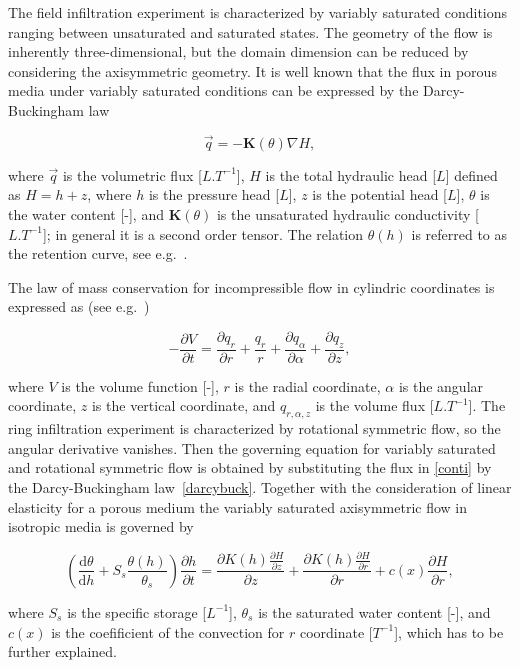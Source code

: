 \documentclass[review]{myarticle}
\newenvironment{lineq}
    {\begin{linenomath*}
    \begin{equation}
    }
    { 
    \end{equation} 
    \end{linenomath*}
    }
\newcommand{\dd}{\mathrm{d}}
\begin{document}
The field infiltration experiment is characterized by variably saturated conditions ranging between unsaturated and saturated states. The geometry of the flow is inherently three-dimensional, but the domain dimension can be reduced by considering the axisymmetric geometry. It is well known that the flux in porous media under variably saturated conditions can be expressed by the Darcy-Buckingham law~\citep{buckingham} \begin{lineq}\label{darcybuck}\vec{q} = -\mathbf{K}(\theta) \nabla H,\end{lineq} where $\vec{q}$ is the volumetric flux [$L.T^{-1}$], $H$ is the total hydraulic head [$L$] defined as $H=h+z$, where $h$ is the pressure head [$L$], $z$ is the potential head [$L$], $\theta$ is the water content [-], and $\mathbf{K}(\theta)$ is the unsaturated hydraulic conductivity  [$L.T^{-1}$]; in general it is a  second order tensor. The relation $\theta(h)$ is referred to as the retention curve, see e.g.~\citep{vangenuchten}.

The law of mass conservation  for incompressible flow in cylindric coordinates  is expressed as (see e.g.~\citep{bear1979})
\begin{lineq}
\label{conti}
-\frac{\partial V}{\partial t} = \frac{\partial q_r}{\partial r} + \frac{q_r}{r} + \frac{\partial q_{\alpha}}{\partial \alpha} + \frac{\partial q_z}{\partial z} ,
\end{lineq}
where $V$ is the volume function [-],  $r$ is the radial coordinate, $\alpha$ is the angular coordinate,  $z$ is the vertical coordinate, and $q_{r, \alpha, z}$ is the  volume flux [$L.T^{-1}$]. The ring infiltration experiment is characterized by rotational symmetric flow, so the angular derivative vanishes. Then the governing equation for  variably saturated and rotational symmetric flow is obtained by substituting the flux in \eqref{conti} by the Darcy-Buckingham law~\eqref{darcybuck}. Together with the consideration of linear elasticity for a porous medium the variably saturated axisymmetric flow in isotropic media is governed by
\begin{lineq}
\label{richaxi}
\left(\frac{\dd \theta}{\dd h} + S_s\frac{\theta(h)}{\theta_s} \right) \frac{\partial h}{\partial t}  =  \frac{\partial K(h) \frac{\partial H}{\partial z}}{\partial z} + \frac{\partial K(h) \frac{\partial H}{\partial r}}{\partial r} + c(x)\frac{\partial H}{\partial r},
\end{lineq}
where $S_s$ is the specific storage [$L^{-1}$], $\theta_s$ is the saturated water content [-], and $c(x)$ is the coefificient of the convection for $r$ coordinate [$T^{-1}$], which has to be further explained.
\end{document}
